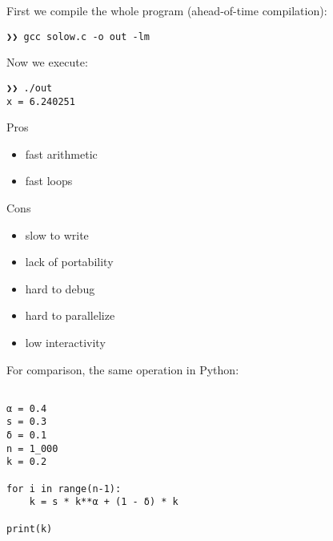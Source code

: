 \begin{frame}[fragile]


    First we compile the whole program (ahead-of-time compilation):
    
    \vspace{0.5em}
    \begin{verbatim}
❯❯ gcc solow.c -o out -lm
    \end{verbatim}



    \vspace{0.5em}
    \vspace{0.5em}
    \vspace{0.5em}
    Now we execute:

    \vspace{0.5em}
    \begin{verbatim}
❯❯ ./out 
x = 6.240251
    \end{verbatim}

\end{frame}


\begin{frame}

    Pros

    \begin{itemize}
        \item fast arithmetic
        \item fast loops
    \end{itemize}


    \vspace{0.5em}

    Cons

    \begin{itemize}
        \item slow to write
        \item lack of portability
        \item hard to debug
        \item hard to parallelize
        \item low interactivity
    \end{itemize}

\end{frame}

\begin{frame}[fragile]


    For comparison, the same operation in Python:
    
    \begin{verbatim}

α = 0.4
s = 0.3
δ = 0.1
n = 1_000
k = 0.2

for i in range(n-1):
    k = s * k**α + (1 - δ) * k

print(k)

    \end{verbatim}

\end{frame}


